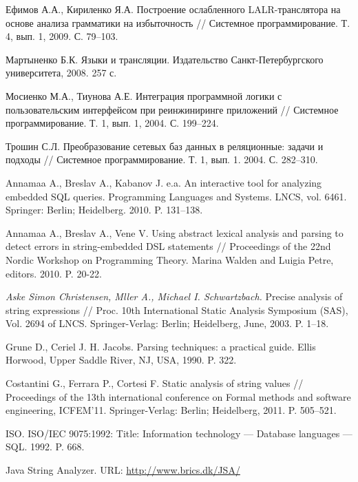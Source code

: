 \documentclass{llncs}
\begin{document}
%
%
\begin{thebibliography}{}
  
Ефимов А.А., Кириленко Я.А. Построение ослабленного LALR-транслятора на основе анализа грамматики на избыточность // Системное программирование. Т. 4, вып. 1, 2009. С. 79–103.  

Мартыненко Б.К. Языки и трансляции. Издательство Санкт-Петербургского университета, 2008. 257 с. 

Мосиенко М.А., Тиунова А.Е. Интеграция программной логики с пользовательским интерфейсом при реинжиниринге приложений // Системное программирование. Т. 1, вып. 1, 2004. С. 199–224.

Трошин С.Л. Преобразование сетевых баз данных в реляционные: задачи и подходы // Системное программирование. Т. 1, вып. 1. 2004. С. 282–310.

Annamaa A., Breslav A., Kabanov J. e.a. An interactive tool for analyzing embedded SQL queries. Programming Languages and Systems. LNCS, vol. 6461. Springer: Berlin; Heidelberg. 2010. P. 131–138.

Annamaa A., Breslav A., Vene V. Using abstract lexical analysis and parsing to detect errors in string-embedded DSL statements // Proceedings of the 22nd Nordic Workshop on Programming Theory. Marina Walden and Luigia Petre, editors. 2010. P. 20-22.

\emph{Aske Simon Christensen, Mller A., Michael I. Schwartzbach.} Precise analysis of string expressions // Proc. 10th International Static Analysis Symposium (SAS), Vol. 2694 of LNCS. Springer-Verlag: Berlin; Heidelberg, June, 2003. P. 1–18.

Grune D., Ceriel J. H. Jacobs. Parsing techniques: a practical guide. Ellis Horwood, Upper Saddle River, NJ, USA, 1990. P. 322.

Costantini G., Ferrara P., Cortesi F. Static analysis of string values // Proceedings of the 13th international conference on Formal methods and software engineering, ICFEM’11. Springer-Verlag: Berlin; Heidelberg, 2011. P. 505–521.

ISO. ISO/IEC 9075:1992: Title: Information technology — Database languages — SQL. 1992. P. 668.

Java String Analyzer. URL: \href{http://www.brics.dk/JSA/}{http://www.brics.dk/JSA/}


\end{thebibliography}
\end{document}

